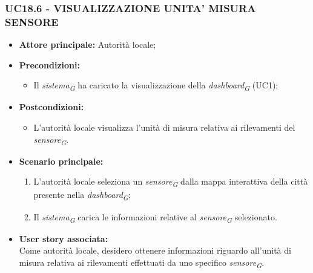 \subsubsection{UC18.6 - VISUALIZZAZIONE UNITA' MISURA SENSORE}
\begin{itemize}
    \item \textbf{Attore principale:} Autorità locale;
    \item \textbf{Precondizioni:}
        \begin{itemize}
            \item Il \textit{sistema}\textsubscript{\textit{G}} ha caricato la visualizzazione della \textit{dashboard}\textsubscript{\textit{G}} (UC1);
        \end{itemize}
    \item \textbf{Postcondizioni:}
        \begin{itemize}
            \item L'autorità locale visualizza l'unità di misura relativa ai rilevamenti del \textit{sensore}\textsubscript{\textit{G}}.
        \end{itemize}
    \item \textbf{Scenario principale:}
        \begin{enumerate}
            \item L'autorità locale seleziona un \textit{sensore}\textsubscript{\textit{G}} dalla mappa interattiva della città presente nella \textit{dashboard}\textsubscript{\textit{G}};
            \item Il \textit{sistema}\textsubscript{\textit{G}} carica le informazioni relative al \textit{sensore}\textsubscript{\textit{G}} selezionato.
        \end{enumerate}
    \item \textbf{User story associata:} \\
    Come autorità locale, desidero ottenere informazioni riguardo all'unità di misura relativa ai rilevamenti effettuati da uno specifico \textit{sensore}\textsubscript{\textit{G}}.
\end{itemize}